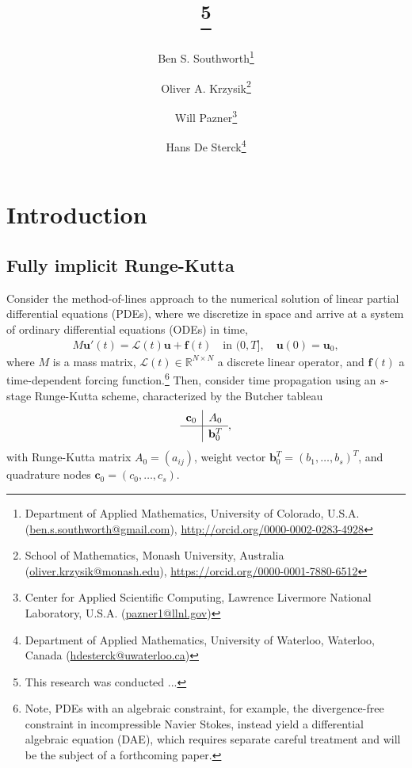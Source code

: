 \documentclass[review]{siamart}
\title{{\TheTitle}\thanks{This research was conducted ...
  }}
\author{
	Ben S. Southworth\thanks{Department of Applied Mathematics,
    University of Colorado,
    U.S.A. (\url{ben.s.southworth@gmail.com}),
    \url{http://orcid.org/0000-0002-0283-4928}}
\and
    Oliver A. Krzysik\thanks{School of Mathematics, Monash University,
  	Australia (\url{oliver.krzysik@monash.edu}),
  	\url{https://orcid.org/0000-0001-7880-6512}}
\and
  	Will Pazner\thanks{Center for Applied Scientific Computing, Lawrence Livermore National Laboratory,
    U.S.A. (\url{pazner1@llnl.gov})}
\and
    Hans De Sterck\thanks{Department of Applied Mathematics,
  	University of Waterloo,
  	Waterloo, Canada
  	(\url{hdesterck@uwaterloo.ca})}
}
\begin{document}
\maketitle
\allowdisplaybreaks

\begin{abstract}

\end{abstract}


\section{Introduction}\label{sec:intro}

\subsection{Fully implicit Runge-Kutta}\label{sec:intro:irk}

Consider the method-of-lines approach to the numerical solution of linear
partial differential equations (PDEs), where we discretize in space and arrive
at a system of ordinary differential equations (ODEs) in time,
%
\begin{align}\label{eq:problem}
M\mathbf{u}'(t) =  \mathcal{L}(t)\mathbf{u} + \mathbf{f}(t)
	\quad\text{in }(0,T], \quad \mathbf{u}(0) = \mathbf{u}_0,
\end{align}
%
where $M$ is a mass matrix, $\mathcal{L}(t)\in\mathbb{R}^{N\times N}$ a discrete
linear operator, and $\mathbf{f}(t)$ a time-dependent forcing
function.\footnote{Note,
PDEs with an algebraic constraint, for example, the divergence-free
constraint in incompressible Navier Stokes, instead yield a differential algebraic equation (DAE), which
requires separate careful treatment and will be the subject of a forthcoming paper.}
Then, consider time propagation using an $s$-stage Runge-Kutta scheme,
characterized by the Butcher tableau
%
\begin{align*}
	\renewcommand\arraystretch{1.2}
	\begin{array}
	{c|c}
	\mathbf{c}_0 & A_0\\
	\hline
	& \mathbf{b}_0^T
	\end{array},
\end{align*}
%
with Runge-Kutta matrix $A_0 = (a_{ij})$, weight vector $\mathbf{b}_0^T = (b_1,
\ldots, b_s)^T$, and quadrature nodes $\mathbf{c}_0 = (c_0, \ldots, c_s)$.
\end{document}
